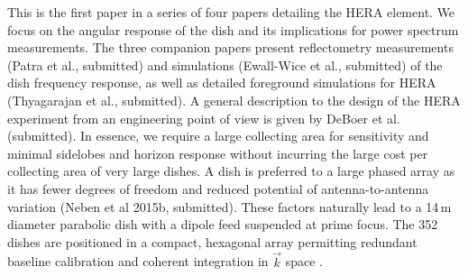 \documentclass{emulateapj}
\begin{document}

This is the first paper in a series of four papers detailing the HERA element. We focus on the 
angular response of the dish and its implications for power spectrum measurements. The three companion 
papers present reflectometry measurements (Patra et al., submitted) and simulations (Ewall-Wice et al., 
submitted) of the dish frequency response, as well as detailed 
foreground simulations for HERA (Thyagarajan et al., submitted). A general description to the design of the 
HERA experiment from an engineering point of view is given by DeBoer et al. (submitted). In essence, we 
require a large collecting area for
 sensitivity and minimal sidelobes and horizon response without incurring the large cost per collecting 
area of very large dishes. A dish is preferred to a large phased array as it has fewer degrees 
of freedom and reduced potential of antenna-to-antenna variation (Neben et al 2015b, 
submitted). These factors naturally lead to a 14\,m diameter parabolic dish with a dipole 
feed suspended at prime focus. The 352 dishes are positioned in a compact, hexagonal 
array permitting redundant baseline calibration and coherent integration in $
\vec{k}$ space \citep{omniscope,ali2015}. 
\end{document}
